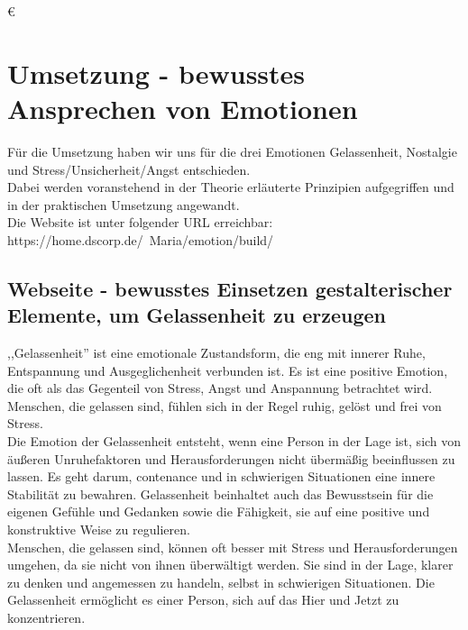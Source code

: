 €\documentclass[./dokumentation.tex]{subfiles}
\begin{document}
\chapter{Umsetzung - bewusstes Ansprechen von Emotionen}
Für die Umsetzung haben wir uns für die drei Emotionen Gelassenheit, Nostalgie und Stress/Unsicherheit/Angst entschieden.\\ 
Dabei werden voranstehend in der Theorie erläuterte Prinzipien aufgegriffen und in der praktischen Umsetzung angewandt.\\
Die Website ist unter folgender URL erreichbar: \\
https://home.dscorp.de/~Maria/emotion/build/

\section{Webseite - bewusstes Einsetzen gestalterischer Elemente, um Gelassenheit zu erzeugen}
,,Gelassenheit'' ist eine emotionale Zustandsform, die eng mit innerer Ruhe, Entspannung und Ausgeglichenheit verbunden ist. Es ist eine positive Emotion, die oft als das Gegenteil von Stress, Angst und Anspannung betrachtet wird. Menschen, die gelassen sind, fühlen sich in der Regel ruhig, gelöst und frei von Stress. \\
Die Emotion der Gelassenheit entsteht, wenn eine Person in der Lage ist, sich von äußeren Unruhefaktoren und Herausforderungen nicht übermäßig beeinflussen zu lassen. Es geht darum, contenance und in schwierigen Situationen eine innere Stabilität zu bewahren. Gelassenheit beinhaltet auch das Bewusstsein für die eigenen Gefühle und Gedanken sowie die Fähigkeit, sie auf eine positive und konstruktive Weise zu regulieren. \\
Menschen, die gelassen sind, können oft besser mit Stress und Herausforderungen umgehen, da sie nicht von ihnen überwältigt werden. Sie sind in der Lage, klarer zu denken und angemessen zu handeln, selbst in schwierigen Situationen. Die Gelassenheit ermöglicht es einer Person, sich auf das Hier und Jetzt zu konzentrieren.\\
\end{document}
